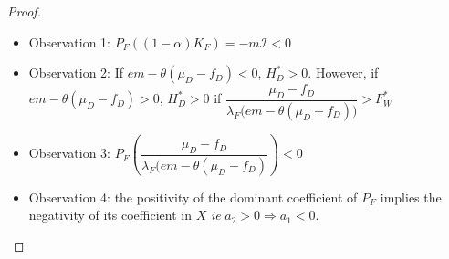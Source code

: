 \documentclass{article}
\newcommand{\lfw}{\lambda_{F}}
\newcommand{\lfw}{\lambda_{F}}
\newcommand{\cI}{\mathcal{I}}
\begin{document}
\begin{proof}
\begin{itemize}
\item Observation 1: $P_F((1-\alpha)K_F) = - m \cI < 0$
\item Observation 2: If $e m - \theta (\mu_D - f_D) < 0$, $H_D^* > 0$. However, if $e m - \theta (\mu_D - f_D) > 0$,  $H_D^* > 0$ if $\dfrac{\mu_D - f_D}{\lfw \Big(e m - \theta (\mu_D - f_D)\Big)} > F_W^*$
\item Observation 3: $P_F\left(\dfrac{\mu_D - f_D}{\lfw \Big(e m - \theta (\mu_D - f_D)} \right) < 0$
\item Observation 4: the positivity of the dominant coefficient of $P_F$ implies the negativity of its coefficient in $X$ \textit{ie} $a_2 > 0 \Rightarrow a_1 < 0$.
\end{itemize}


\end{proof}
\end{document}
